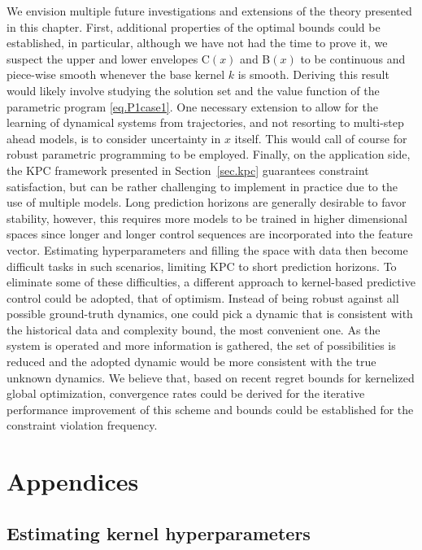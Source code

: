 We envision multiple future investigations and extensions of the theory presented in this chapter. First, additional properties of the optimal bounds could be established, in particular, although we have not had the time to prove it, we suspect the upper and lower envelopes C$(x)$ and B$(x)$ to be continuous and piece-wise smooth whenever the base kernel $k$ is smooth. Deriving this result would likely involve studying the solution set and the value function of the parametric program \eqref{eq.P1case1}.  One necessary extension to allow for the learning of dynamical systems from trajectories, and not resorting to multi-step ahead models, is to consider uncertainty in $x$ itself. This would call of course for robust parametric programming to be employed. Finally, on the application side, the KPC framework presented in Section~\ref{sec.kpc} guarantees constraint satisfaction, but can be rather challenging to implement in practice due to the use of multiple models. Long prediction horizons are generally desirable to favor stability, however, this requires more models to be trained in higher dimensional spaces since longer and longer control sequences are incorporated into the feature vector. Estimating hyperparameters and filling the space with data then become difficult tasks in such scenarios, limiting KPC to short prediction horizons. To eliminate some of these difficulties, a different approach to kernel-based predictive control could be adopted, that of optimism. Instead of being robust against all possible ground-truth dynamics, one could pick a dynamic that is consistent with the historical data and complexity bound, the most convenient one. As the system is operated and more information is gathered, the set of possibilities is reduced and the adopted dynamic would be more consistent with the true unknown dynamics. We believe that, based on recent regret bounds for kernelized global optimization, convergence rates could be derived for the iterative performance improvement of this scheme and bounds could be established for the constraint violation frequency.

\section{Appendices}

\subsection{Estimating kernel hyperparameters}
\label{sec.appendix_hyerparams}

